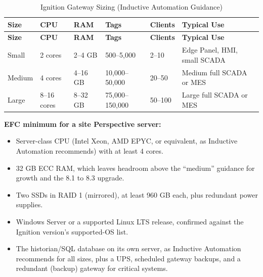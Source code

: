 \begin{longtable}{@{}P{2.05cm}P{1.87cm}P{1.68cm}P{2.43cm}P{2.43cm}P{3.92cm}@{}}
\caption{Ignition Gateway Sizing (Inductive Automation Guidance)}\label{tab:ignition-sizing} \\
\toprule
{}\textbf{Size} & \textbf{CPU} & \textbf{RAM} & \textbf{Tags} & \textbf{Clients} & \textbf{Typical Use} \\
\midrule
\endfirsthead
\toprule
{}\textbf{Size} & \textbf{CPU} & \textbf{RAM} & \textbf{Tags} & \textbf{Clients} & \textbf{Typical Use} \\
\midrule
\endhead
Small & 2 cores & 2--4 GB & 500--5,000 & 2--10 & Edge Panel, HMI, small SCADA \\
Medium & 4 cores & 4--16 GB & 10,000--50,000 & 20--50 & Medium full SCADA or MES \\
Large & 8--16 cores & 8--32 GB & 75,000--150,000 & 50--100 & Large full SCADA or MES \\
\bottomrule
\end{longtable}

\textbf{EFC minimum for a site Perspective server:}
\begin{itemize}[itemsep=1pt]
  \item Server-class CPU (Intel Xeon, AMD EPYC, or equivalent, as Inductive Automation recommends) with at least 4 cores.
  \item 32 GB ECC RAM, which leaves headroom above the ``medium'' guidance for growth and the 8.1 to 8.3 upgrade.
  \item Two SSDs in RAID 1 (mirrored), at least 960 GB each, plus redundant power supplies.
  \item Windows Server or a supported Linux LTS release, confirmed against the Ignition version's supported-OS list.
  \item The historian/SQL database on its own server, as Inductive Automation recommends for all sizes, plus a UPS, scheduled gateway backups, and a redundant (backup) gateway for critical systems.
\end{itemize}

